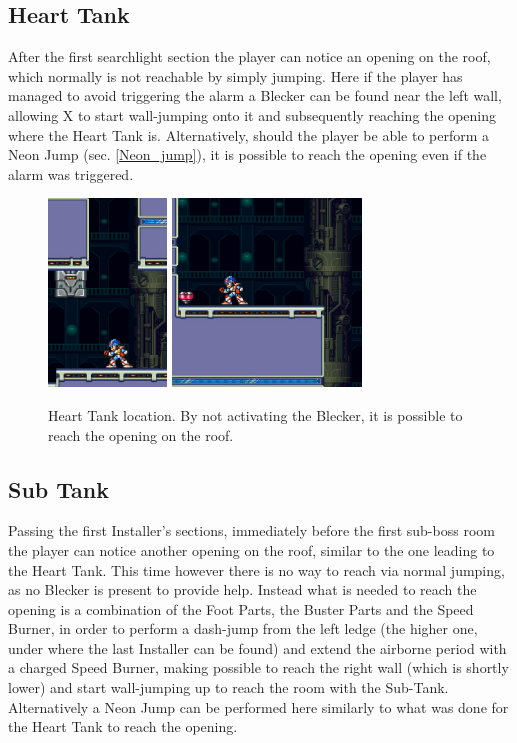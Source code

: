 \subsection{Heart Tank}
After the first searchlight section the player can notice an opening on the roof, which normally is not reachable by simply jumping. Here if the player has managed to avoid triggering the alarm a Blecker can be found near the left wall, allowing X to start wall-jumping onto it and subsequently reaching the opening where the Heart Tank is. Alternatively, should the player be able to perform a Neon Jump (sec. \ref{Neon_jump}), it is possible to reach the opening even if the alarm was triggered.

\begin{figure}[htp]
	\centering
	\includegraphics[height=5cm]{figures/X2/Magna_centipede/Centipede_heart_1.png}
	\includegraphics[height=5cm]{figures/X2/Magna_centipede/Centipede_heart_2.png}
	\caption{Heart Tank location. By not activating the Blecker, it is possible to reach the opening on the roof.}
\end{figure}

\subsection{Sub Tank}
Passing the first Installer's sections, immediately before the first sub-boss room the player can notice another opening on the roof, similar to the one leading to the Heart Tank. This time however there is no way to reach via normal jumping, as no Blecker is present to provide help. Instead what is needed to reach the opening is a combination of the Foot Parts, the Buster Parts and the Speed Burner, in order to perform a dash-jump from the left ledge (the higher one, under where the last Installer can be found) and extend the airborne period with a charged Speed Burner, making possible to reach the right wall (which is shortly lower) and start wall-jumping up to reach the room with the Sub-Tank. Alternatively a Neon Jump can be performed here similarly to what was done for the Heart Tank to reach the opening.

